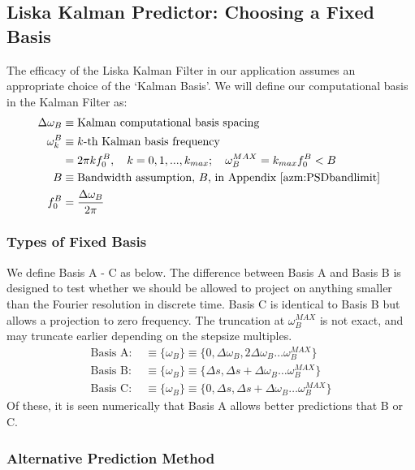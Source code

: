 \subsection{Liska Kalman Predictor: Choosing a Fixed Basis} \label{sec:ap_liska_fixedbasis}

The efficacy of the Liska Kalman Filter in our application assumes an appropriate choice of the `Kalman Basis'. We will define our computational basis in the Kalman Filter as:
\begin{align}
\Delta \omega_B  &\equiv \text{Kalman computational basis spacing} \\
\omega_k^B &\equiv \text{$k$-th Kalman basis frequency} \\
&= 2 \pi k f_0^B, \quad k = 0, 1, ..., k_{max};  \quad \omega_B^{MAX} = k_{max} f_0^B < B \\
B  &\equiv \text{Bandwidth assumption, $B$,  in Appendix \ref{azm:PSDbandlimit} } \\
f_0^B &=  \frac{\Delta \omega_B}{2 \pi}
\end{align}

\subsubsection{Types of Fixed Basis}
We define Basis A - C as below. The  difference between Basis A and Basis B is designed to test whether we should be allowed to project on anything smaller than the Fourier resolution in discrete time. Basis C is identical to Basis B but allows a projection to zero frequency. The truncation at $\omega_B^{MAX}$ is not exact, and may truncate earlier depending on the stepsize multiples.
\begin{align}
\text{Basis A: } &\equiv \{\omega_B\} \equiv \{0, \Delta \omega_B, 2\Delta \omega_B \dots  \omega_B^{MAX}\} \\
\text{Basis B: } &\equiv \{\omega_B\} \equiv \{ \Delta s, \Delta s + \Delta \omega_B \dots  \omega_B^{MAX}\} \\
\text{Basis C: } &\equiv \{\omega_B\} \equiv \{ 0, \Delta s, \Delta s + \Delta \omega_B \dots  \omega_B^{MAX}\} 
\end{align}
Of these, it is seen numerically that Basis A allows better predictions that B or C.

\subsubsection{Alternative Prediction Method}

